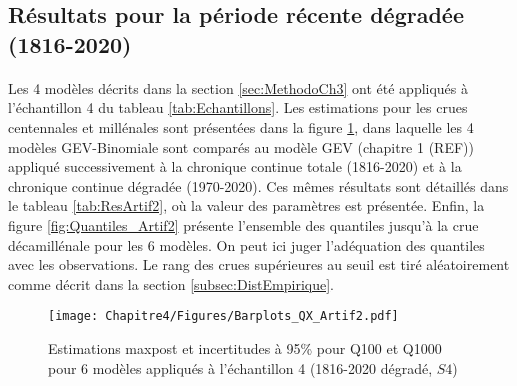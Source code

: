 	\FloatBarrier	
	
	\subsection{Résultats pour la période récente dégradée (1816-2020)}
	\label{subsec:ResultsArtif}
	
	\paragraph{} 
	Les 4 modèles décrits dans la section \ref{sec:MethodoCh3} ont été appliqués à l'échantillon 4 du tableau \ref{tab:Echantillons}. Les estimations pour les crues centennales et millénales sont présentées dans la figure \ref{fig:Barplot_Artif2}, dans laquelle les 4 modèles GEV-Binomiale sont comparés au modèle GEV (chapitre 1 (REF)) appliqué successivement à la chronique continue totale (1816-2020) et à la chronique continue dégradée (1970-2020). Ces mêmes résultats sont détaillés dans le tableau \ref{tab:ResArtif2}, où la valeur des paramètres est présentée. Enfin, la figure \ref{fig:Quantiles_Artif2} présente l'ensemble des quantiles jusqu'à la crue décamillénale pour les 6 modèles. On peut ici juger l'adéquation des quantiles avec les observations. Le rang des crues supérieures au seuil est tiré aléatoirement comme décrit dans la section \ref{subsec:DistEmpirique}. 	
	
	\begin{figure}[h]
		\centering
		\texttt{[image: Chapitre4/Figures/Barplots\_QX\_Artif2.pdf]}	
		\caption{Estimations maxpost et incertitudes à 95\% pour Q100 et Q1000 pour 6 modèles appliqués à l'échantillon 4 (1816-2020 dégradé, $S4$)}
		\label{fig:Barplot_Artif2}
	\end{figure}

